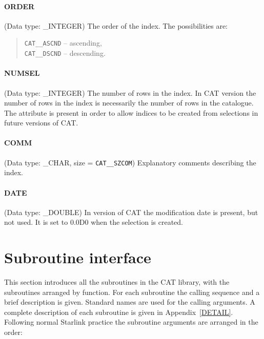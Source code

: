\paragraph{ORDER}
(Data type: \_INTEGER)
The order of the index. The possibilities are:

\begin{verse}
{\tt CAT\_\_ASCND} -- ascending,  \\
{\tt CAT\_\_DSCND} -- descending.
\end{verse}

\paragraph{NUMSEL}
(Data type: \_INTEGER)
The number of rows in the index. In CAT version \CATversion the number
of rows in the index is necessarily the number of rows in the catalogue.
The attribute is present in order to allow indices to be created from
selections in future versions of CAT.

\paragraph{COMM}
(Data type: \_CHAR, size = {\tt CAT\_\_SZCOM})
Explanatory comments describing the index.

\paragraph{DATE}
(Data type: \_DOUBLE)
In version \CATversion of CAT the modification date is present, but 
not used. It is set to 0.0D0 when the selection is created.


\section{\label{SUBINT}Subroutine interface}


% 



This section introduces all the subroutines in the CAT library, with the
subroutines arranged by function. For each subroutine the calling 
sequence and a brief description is given. Standard names are used for 
the calling arguments. A complete description of each subroutine is
given in Appendix~\ref{DETAIL}. Following normal Starlink practice the
subroutine arguments are arranged in the order:

